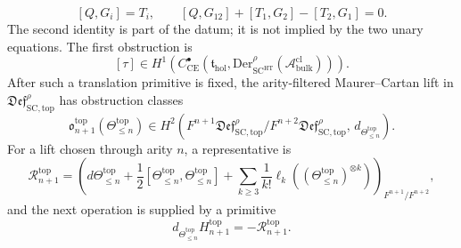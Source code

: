 \begin{defn}
\[
  [Q,G_i]=T_i,\qquad
  [Q,G_{12}]+[T_1,G_2]-[T_2,G_1]=0 .
\]
The second identity is part of the datum; it is not implied by the two
unary equations.  The first obstruction is
\[
  [\tau]\in
  H^1\!\left(
    C^\bullet_{\mathrm{CE}}\!\left(
      \mathfrak t_{\mathrm{hol}},
      \mathrm{Der}^{\rho}_{\mathrm{SC}^{\mathrm{HT}}}
      (\mathcal A^{\mathrm{cl}}_{\mathrm{bulk}})\right)\right).
\]
After such a translation primitive is fixed, the arity-filtered
Maurer--Cartan lift in
\(\mathfrak{Def}^{\rho}_{\mathrm{SC},\mathrm{top}}\) has obstruction
classes
\[
  \mathfrak o^{\mathrm{top}}_{n+1}(\Theta^{\mathrm{top}}_{\le n})
  \in
  H^2\!\left(
    F^{n+1}\mathfrak{Def}^{\rho}_{\mathrm{SC},\mathrm{top}}/
    F^{n+2}\mathfrak{Def}^{\rho}_{\mathrm{SC},\mathrm{top}},\,
    d_{\Theta^{\mathrm{top}}_{\le n}}\right).
\]
For a lift chosen through arity \(n\), a representative is
\[
  \mathcal R^{\mathrm{top}}_{n+1}
  =
  \left(
  d\Theta^{\mathrm{top}}_{\le n}
  +\frac12[\Theta^{\mathrm{top}}_{\le n},
          \Theta^{\mathrm{top}}_{\le n}]
  +\sum_{k\ge3}\frac1{k!}
    \ell_k((\Theta^{\mathrm{top}}_{\le n})^{\otimes k})
  \right)_{F^{n+1}/F^{n+2}},
\]
and the next operation is supplied by a primitive
\[
  d_{\Theta^{\mathrm{top}}_{\le n}}H^{\mathrm{top}}_{n+1}
  =-\mathcal R^{\mathrm{top}}_{n+1}.
\]
\end{defn}

